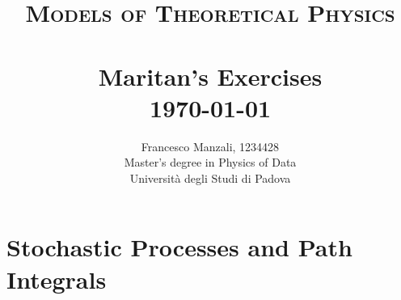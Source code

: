 \documentclass[../template.tex]{subfiles}
\begin{document}
\title{ \normalsize \textsc{Models of Theoretical Physics}
                \\ [2.0cm]
                \HRule{0.5pt} \\
                \LARGE \textbf{{Maritan's Exercises}}
                \HRule{2pt} \\ [0.5cm]
                \normalsize \today \vspace*{5\baselineskip}}

\date{}

\author{
    Francesco Manzali, 1234428\\
    Master's degree in Physics of Data \\ 
    Università degli Studi di Padova}

\maketitle
\restoregeometry
\tableofcontents
\newpage

\setcounter{chapter}{1}
\chapter{Stochastic Processes and Path Integrals}
\end{document}

